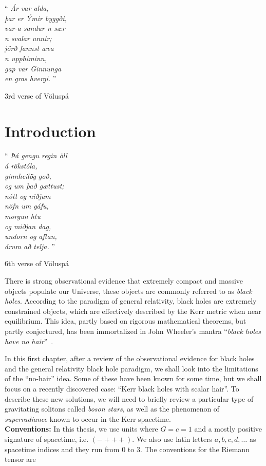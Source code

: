 \thispagestyle{empty}
\epigraph{ 
``\emph{
Ár var alda, \\
þar er Ýmir byggði, \\
var-a sandur n sær \\
n svalar unnir; \\
jörð fannst æva \\
n upphiminn, \\
gap var Ginnunga \\
en gras hvergi.}
''}{3rd verse of Völuspá}
\chapter{Introduction}
\label{ch:intro}

\epigraph{``\emph{
Þá gengu regin öll \\
á rökstóla, \\
ginnheilög goð, \\
og um það gættust; \\
nótt og niðjum \\
nöfn um gáfu, \\ 
morgun htu \\
og miðjan dag, \\
undorn og aftan, \\
árum að telja.} 
''}{6th verse of Völuspá}


There is strong observational evidence that extremely compact and massive objects populate our Universe, these objects are commonly referred to as \textit{black holes}.
According to the paradigm of general relativity, black holes are extremely constrained objects, which are effectively described by the Kerr metric when near equilibrium.
This idea, partly based on rigorous mathematical theorems, but partly conjectured, has been immortalized in John Wheeler's mantra ``\textit{black holes have no hair}''~\cite{Misner:1974qy}. 


In this first chapter, after a review of the observational evidence for black holes and the general relativity black hole paradigm, we shall look into the limitations of the ``no-hair'' idea.
Some of these have been known for some time, but we shall focus on a recently discovered case: ``Kerr black holes with scalar hair''.
To describe these new solutions, we will need to briefly review a particular type of gravitating solitons called \textit{boson stars}, as well as the phenomenon of \textit{superradiance} known to occur in the Kerr spacetime. \\
\bigskip
\textbf{Conventions:}
In this thesis, we use units where $G=c=1$ and a mostly positive signature of spacetime, i.e. $(-+++)$.
We also use latin letters $a,b,c,d,\ldots$ as spacetime indices and they run from $0$ to $3$.
The conventions for the Riemann tensor are


